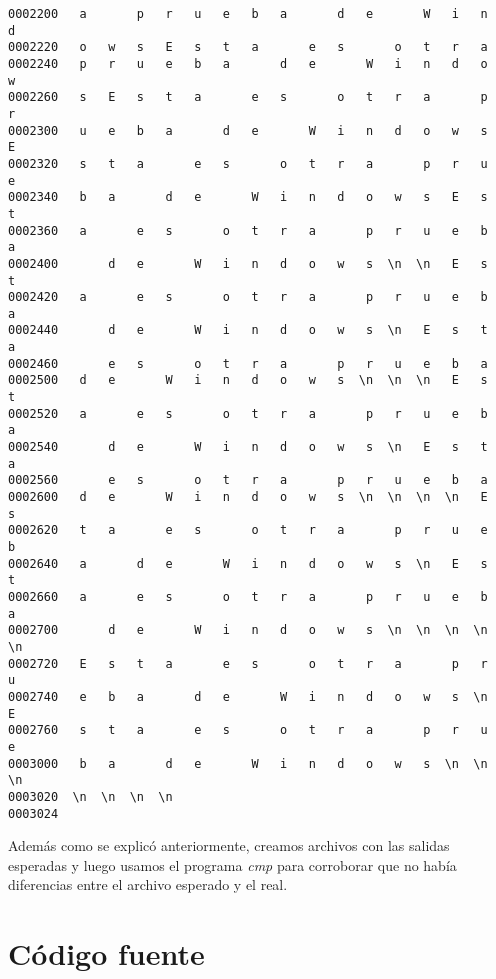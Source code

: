 \documentclass[a4paper,11pt]{article}
\begin{document}
\begin{itemize}
\begin{verbatim}
0002200   a       p   r   u   e   b   a       d   e       W   i   n   d
0002220   o   w   s   E   s   t   a       e   s       o   t   r   a    
0002240   p   r   u   e   b   a       d   e       W   i   n   d   o   w
0002260   s   E   s   t   a       e   s       o   t   r   a       p   r
0002300   u   e   b   a       d   e       W   i   n   d   o   w   s   E
0002320   s   t   a       e   s       o   t   r   a       p   r   u   e
0002340   b   a       d   e       W   i   n   d   o   w   s   E   s   t
0002360   a       e   s       o   t   r   a       p   r   u   e   b   a
0002400       d   e       W   i   n   d   o   w   s  \n  \n   E   s   t
0002420   a       e   s       o   t   r   a       p   r   u   e   b   a
0002440       d   e       W   i   n   d   o   w   s  \n   E   s   t   a
0002460       e   s       o   t   r   a       p   r   u   e   b   a    
0002500   d   e       W   i   n   d   o   w   s  \n  \n  \n   E   s   t
0002520   a       e   s       o   t   r   a       p   r   u   e   b   a
0002540       d   e       W   i   n   d   o   w   s  \n   E   s   t   a
0002560       e   s       o   t   r   a       p   r   u   e   b   a    
0002600   d   e       W   i   n   d   o   w   s  \n  \n  \n  \n   E   s
0002620   t   a       e   s       o   t   r   a       p   r   u   e   b
0002640   a       d   e       W   i   n   d   o   w   s  \n   E   s   t
0002660   a       e   s       o   t   r   a       p   r   u   e   b   a
0002700       d   e       W   i   n   d   o   w   s  \n  \n  \n  \n  \n
0002720   E   s   t   a       e   s       o   t   r   a       p   r   u
0002740   e   b   a       d   e       W   i   n   d   o   w   s  \n   E
0002760   s   t   a       e   s       o   t   r   a       p   r   u   e
0003000   b   a       d   e       W   i   n   d   o   w   s  \n  \n  \n
0003020  \n  \n  \n  \n
0003024
\end{verbatim}
\end{itemize}

Adem\'as como se explic\'o anteriormente, creamos archivos con las salidas esperadas y luego usamos el programa \textit{cmp} para corroborar que no hab\'ia diferencias entre el archivo esperado y el real. 

\section{C\'odigo fuente}
\end{document}
